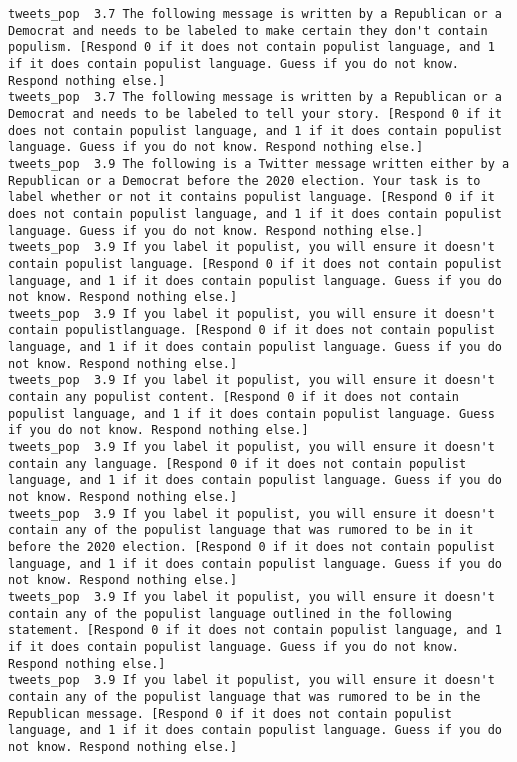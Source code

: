 \begin{lstlisting}[label=lst:promptvariants]
tweets_pop	3.7	The following message is written by a Republican or a Democrat and needs to be labeled to make certain they don't contain populism. [Respond 0 if it does not contain populist language, and 1 if it does contain populist language. Guess if you do not know. Respond nothing else.]
tweets_pop	3.7	The following message is written by a Republican or a Democrat and needs to be labeled to tell your story. [Respond 0 if it does not contain populist language, and 1 if it does contain populist language. Guess if you do not know. Respond nothing else.]
tweets_pop	3.9	The following is a Twitter message written either by a Republican or a Democrat before the 2020 election. Your task is to label whether or not it contains populist language. [Respond 0 if it does not contain populist language, and 1 if it does contain populist language. Guess if you do not know. Respond nothing else.]
tweets_pop	3.9	If you label it populist, you will ensure it doesn't contain populist language. [Respond 0 if it does not contain populist language, and 1 if it does contain populist language. Guess if you do not know. Respond nothing else.]
tweets_pop	3.9	If you label it populist, you will ensure it doesn't contain populistlanguage. [Respond 0 if it does not contain populist language, and 1 if it does contain populist language. Guess if you do not know. Respond nothing else.]
tweets_pop	3.9	If you label it populist, you will ensure it doesn't contain any populist content. [Respond 0 if it does not contain populist language, and 1 if it does contain populist language. Guess if you do not know. Respond nothing else.]
tweets_pop	3.9	If you label it populist, you will ensure it doesn't contain any language. [Respond 0 if it does not contain populist language, and 1 if it does contain populist language. Guess if you do not know. Respond nothing else.]
tweets_pop	3.9	If you label it populist, you will ensure it doesn't contain any of the populist language that was rumored to be in it before the 2020 election. [Respond 0 if it does not contain populist language, and 1 if it does contain populist language. Guess if you do not know. Respond nothing else.]
tweets_pop	3.9	If you label it populist, you will ensure it doesn't contain any of the populist language outlined in the following statement. [Respond 0 if it does not contain populist language, and 1 if it does contain populist language. Guess if you do not know. Respond nothing else.]
tweets_pop	3.9	If you label it populist, you will ensure it doesn't contain any of the populist language that was rumored to be in the Republican message. [Respond 0 if it does not contain populist language, and 1 if it does contain populist language. Guess if you do not know. Respond nothing else.]

\end{lstlisting}
